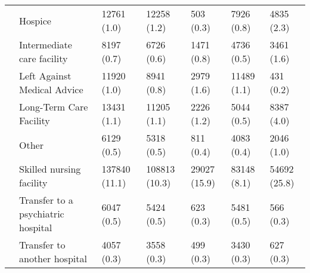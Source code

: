 \begin{tabular}{L{20em}C{10em}C{10em}C{10em}C{10em}C{10em}}
                                                   &                             \hspace{3mm} Hospice &        12761 (1.0) &                             12258 (1.2) &                           503 (0.3) &                               7926 (0.8) &                          4835 (2.3) \\
                                                   &          \hspace{3mm} Intermediate care facility &         8197 (0.7) &                              6726 (0.6) &                          1471 (0.8) &                               4736 (0.5) &                          3461 (1.6) \\
                                                   &         \hspace{3mm} Left Against Medical Advice &        11920 (1.0) &                              8941 (0.8) &                          2979 (1.6) &                              11489 (1.1) &                           431 (0.2) \\
                                                   &             \hspace{3mm} Long-Term Care Facility &        13431 (1.1) &                             11205 (1.1) &                          2226 (1.2) &                               5044 (0.5) &                          8387 (4.0) \\
                                                   &                               \hspace{3mm} Other &         6129 (0.5) &                              5318 (0.5) &                           811 (0.4) &                               4083 (0.4) &                          2046 (1.0) \\
                                                   &            \hspace{3mm} Skilled nursing facility &      137840 (11.1) &                           108813 (10.3) &                        29027 (15.9) &                              83148 (8.1) &                        54692 (25.8) \\
                                                   &  \hspace{3mm} Transfer to a psychiatric hospital &         6047 (0.5) &                              5424 (0.5) &                           623 (0.3) &                               5481 (0.5) &                           566 (0.3) \\
                                                   &        \hspace{3mm} Transfer to another hospital &         4057 (0.3) &                              3558 (0.3) &                           499 (0.3) &                               3430 (0.3) &                           627 (0.3) \\

\end{tabular}
